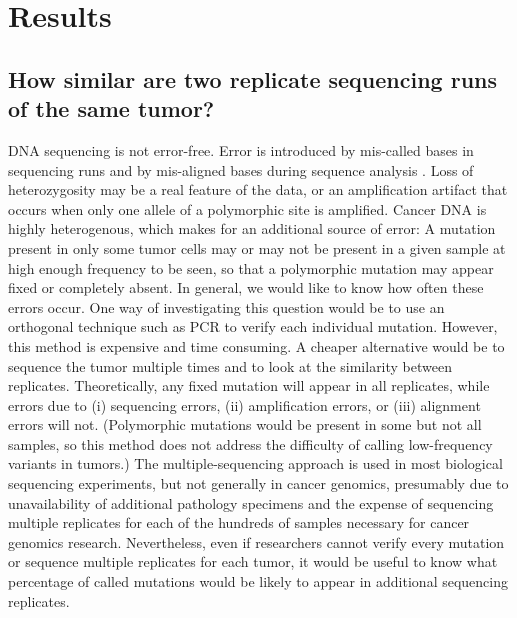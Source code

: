 \documentclass[11pt]{article} %
\begin{document}
\section*{Results}

\subsection*{How similar are two replicate sequencing runs of the same tumor?}


DNA sequencing is not error-free. Error is introduced by mis-called bases in sequencing runs and by mis-aligned bases during sequence analysis \citep{seqerror}. Loss of heterozygosity may be a real feature of the data, or an amplification artifact that occurs when only one allele of a polymorphic site is amplified. Cancer DNA is highly heterogenous, which makes for an additional source of error: A mutation present in only some tumor cells may or may not be present in a given sample at high enough frequency to be seen, so that a polymorphic mutation may appear fixed or completely absent. In general, we would like to know how often these errors occur. One way of investigating this question would be to use an orthogonal technique such as PCR to verify each individual mutation. However, this method is expensive and time consuming. A cheaper alternative would be to sequence the tumor multiple times and to look at the similarity between replicates. Theoretically, any fixed mutation will appear in all replicates, while errors due to (i) sequencing errors, (ii) amplification errors, or (iii) alignment errors will not. (Polymorphic mutations would be present in some but not all samples, so this method does not address the difficulty of calling low-frequency variants in tumors.) The multiple-sequencing approach is used in most biological sequencing experiments, but not generally in cancer genomics, presumably due to unavailability of additional pathology specimens and the expense of sequencing multiple replicates for each of the hundreds of samples necessary for cancer genomics research. Nevertheless, even if researchers cannot verify every mutation or sequence multiple replicates for each tumor, it would be useful to know what percentage of called mutations would be likely to appear in additional sequencing replicates.
\end{document}
